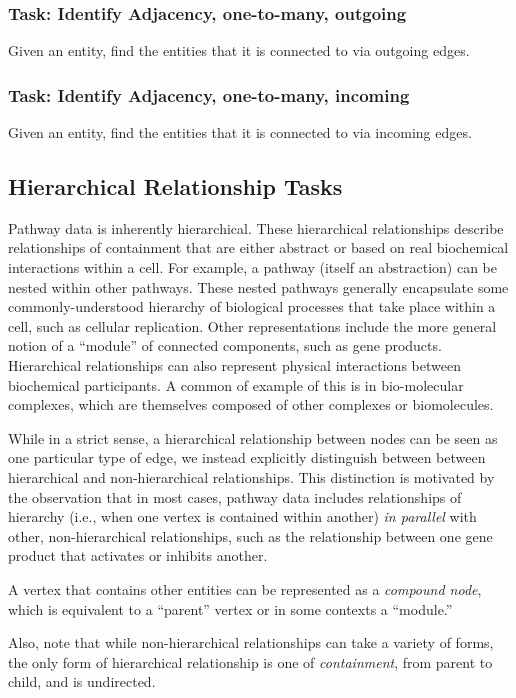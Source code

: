 \documentclass{egpubl}
\begin{document}
\subsubsection{Task: Identify Adjacency, one-to-many, outgoing}
Given an entity, find the entities that it is connected to via outgoing edges.

\subsubsection{Task: Identify Adjacency, one-to-many, incoming}
Given an entity, find the entities that it is connected to via incoming edges.

\subsection{Hierarchical Relationship Tasks}

Pathway data is inherently hierarchical.
These hierarchical relationships describe relationships of containment that are either abstract or based on real biochemical interactions within a cell.
For example, a pathway (itself an abstraction) can be nested within other pathways.
These nested pathways generally encapsulate some commonly-understood hierarchy of biological processes that take place within a cell, such as cellular replication.
Other representations include the more general notion of a ``module'' of connected components, such as gene products.
Hierarchical relationships can also represent physical interactions between biochemical participants.
A common of example of this is in bio-molecular complexes, which are themselves composed of other complexes or biomolecules.

While in a strict sense, a hierarchical relationship between nodes can be seen as one particular type of edge, we instead explicitly distinguish between between hierarchical and non-hierarchical relationships.
This distinction is motivated by the observation that in most cases, pathway data includes relationships of hierarchy (i.e., when one vertex is contained within another) \textit{in parallel} with other, non-hierarchical relationships, such as the relationship between one gene product that activates or inhibits another.

A vertex that contains other entities can be represented as a \textit{compound node}, which is equivalent to a ``parent'' vertex or in some contexts a ``module.''

Also, note that while non-hierarchical relationships can take a variety of forms, the only form of hierarchical relationship is one of \textit{containment}, from parent to child, and is undirected.
\end{document}
